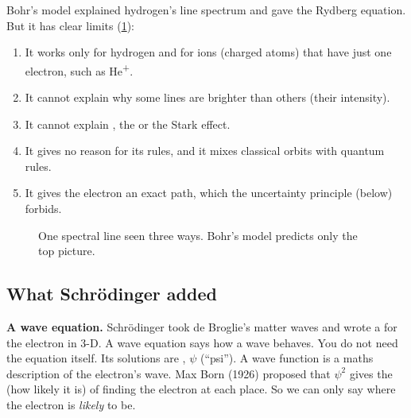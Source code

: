 Bohr's model explained hydrogen's line spectrum and gave the Rydberg equation. But it has clear
limits (\cref{ch3:fig:zeeman}):
\begin{enumerate}
  \item It works only for hydrogen and for ions (charged atoms) that have just one electron,
        such as He\textsuperscript{+}.
  \item It cannot explain why some lines are brighter than others (their intensity).
  \item It cannot explain , the  or the Stark effect.
  \item It gives no reason for its rules, and it mixes classical orbits with quantum rules.
  \item It gives the electron an exact path, which the uncertainty principle (below) forbids.
\end{enumerate}

\begin{figure}
  \centering
  \caption{One spectral line seen three ways. Bohr's model predicts only the top picture.}
  \label{ch3:fig:zeeman}
\end{figure}

\subsection{What Schrödinger added}

\textbf{A wave equation.} Schrödinger took de Broglie's matter waves and wrote a
 for the electron in 3-D. A wave equation says how a wave behaves. You
do not need the equation itself. Its solutions are , $\psi$ (``psi''). A
wave function is a maths description of the electron's wave. Max Born (1926) proposed that
$\psi^2$ gives the  (how likely it is) of finding the electron at each
place. So we can only say where the electron is \emph{likely} to be.

